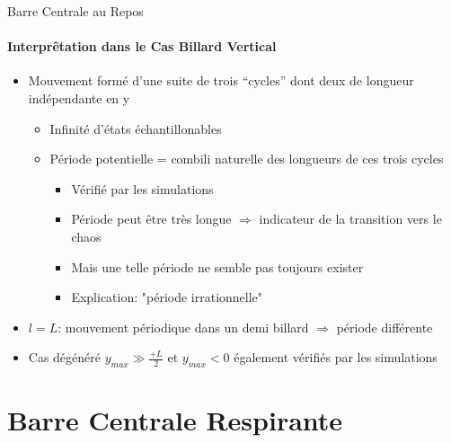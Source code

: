 \documentclass[draft]{beamer}
\begin{document}
  \begin{frame}{Barre Centrale au Repos}
  \framesubtitle{Interprêtation dans le Cas Billard Vertical}
  \begin{itemize}
    \item Mouvement formé d'une suite de trois ``cycles'' dont deux de longueur indépendante en y
    \begin{itemize}
      \item Infinité d'états échantillonables
      \item Période potentielle = combili naturelle des longueurs de ces trois cycles
      \begin{itemize}
        \item Vérifié par les simulations
        \item Période peut être très longue \(\Rightarrow\) indicateur de la transition vers le chaos
        \item Mais une telle période ne semble pas toujours exister
        \item Explication: "période irrationnelle"
      \end{itemize}
    \end{itemize}
    \item \(l=L\): mouvement périodique dans un demi billard \(\Rightarrow\) période différente 
    \item Cas dégénéré \(y_{max} \gg \frac{+L}{2}\) et \( y_{max}<0 \) également vérifiés par les simulations
  \end{itemize}
  \end{frame}

  \section{Barre Centrale Respirante}
  
\end{document}
